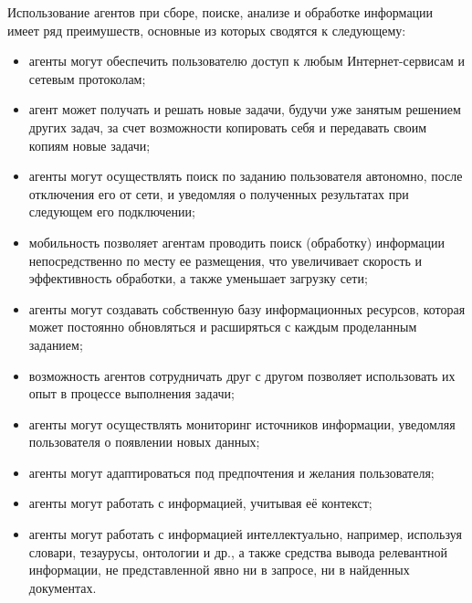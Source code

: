 Использование агентов при сборе, поиске, анализе и обработке информации имеет ряд преимушеств, основные из которых сводятся к следующему:
\begin{itemize}
\item агенты могут обеспечить пользователю доступ к любым Интернет-сервисам и сетевым протоколам;
\item агент может получать и решать новые задачи, будучи уже занятым решением других задач, за счет возможности копировать себя и передавать своим копиям новые задачи;
\item агенты могут осуществлять поиск по заданию пользователя автономно, после отключения его от сети, и уведомляя о полученных результатах при следующем его подключении;
\item мобильность позволяет агентам проводить поиск (обработку) информации непосредственно по месту ее размещения, что увеличивает скорость и эффективность обработки, а также уменьшает загрузку сети;
\item агенты могут создавать собственную базу информационных ресурсов, которая может постоянно обновляться и расширяться с каждым проделанным заданием;
\item возможность агентов сотрудничать друг с другом позволяет использовать их опыт в процессе выполнения задачи;
\item агенты могут осуществлять мониторинг источников информации, уведомляя пользователя о появлении новых данных;
\item агенты могут адаптироваться под предпочтения и желания пользователя;
\item агенты могут работать с информацией, учитывая её контекст;
\item агенты могут работать с информацией интеллектуально, например, используя словари, тезаурусы, онтологии и др., а также средства вывода релевантной информации, не представленной явно ни в запросе, ни в найденных документах.
\end{itemize}

